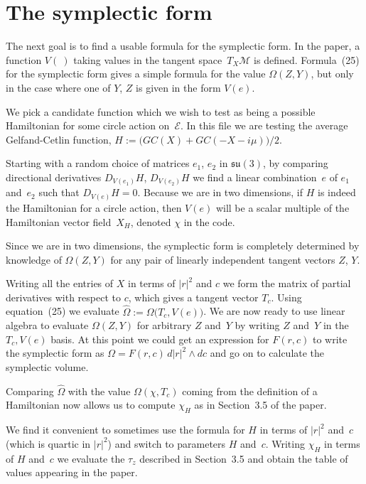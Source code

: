 \documentclass[12pt]{amsart}
\begin{document}
\section{The symplectic form}
The next goal is to find a usable formula for the symplectic form.
In the paper, a function $V(~)$ taking values in the tangent space~$T_X{\mathcal M}$ is
defined.
Formula~(25) for the symplectic form gives a simple formula for the value $\Omega(Z,Y)$,
but only in the case where one of $Y$, $Z$ is given in the form $V(e)$.

We pick a candidate function which we wish to test as being a possible Hamiltonian for some
circle action on~$\mathcal E$.
In this file we are testing the average Gelfand-Cetlin function,
$H:=\bigl(GC(X)+GC(-X-i\mu)\bigr)/2$.


Starting with a random choice of matrices $e_1$, $e_2$ in $\mathfrak{su}(3)$, by comparing
directional derivatives $D_{V(e_1)}H$, $D_{V(e_2)}H$ we find a linear combination~$e$ of
$e_1$ and~$e_2$ such that $D_{V(e)}H=0$.
Because we are in two dimensions, if $H$ is indeed the Hamiltonian for a circle action, 
then $V(e)$ will be a scalar multiple of the Hamiltonian vector field~$X_H$, denoted $\chi$
in the code.

Since we are in two dimensions, the symplectic form is completely determined by knowledge
of $\Omega (Z,Y)$ for any pair of linearly independent tangent vectors $Z$, $Y$.

Writing all the entries of $X$ in terms of $|r|^2$ and $c$ we form the matrix of
partial derivatives with respect to $c$, which gives a tangent vector $T_c$.
Using equation~(25) we evaluate $\hat{\Omega}:=\Omega\bigl(T_c,V(e)\bigr)$.
We are now ready to use linear algebra to evaluate $\Omega(Z,Y)$ for arbitrary $Z$ and~$Y$
by writing $Z$ and~$Y$ in the $T_c, V(e)$ basis.
At this point we could get an expression for $F(r,c)$ to write the symplectic form as
$\Omega = F(r,c)\,d|r|^2\wedge dc$ and go on to calculate the symplectic volume.

Comparing $\hat{\Omega}$ with the value $\Omega(\chi,T_c)$ coming from the definition
of a Hamiltonian now allows us to compute $\chi_H$ as in Section~3.5 of the paper.

We find it convenient to sometimes use the formula for $H$ in terms of $|r|^2$ and~$c$
(which is quartic in $|r|^2$) and switch to parameters $H$ and~$c$.
Writing $\chi_H$ in terms of $H$ and~$c$ we evaluate the $\tau_z$ described in Section~3.5
and obtain the table of values appearing in the paper.
\end{document}
